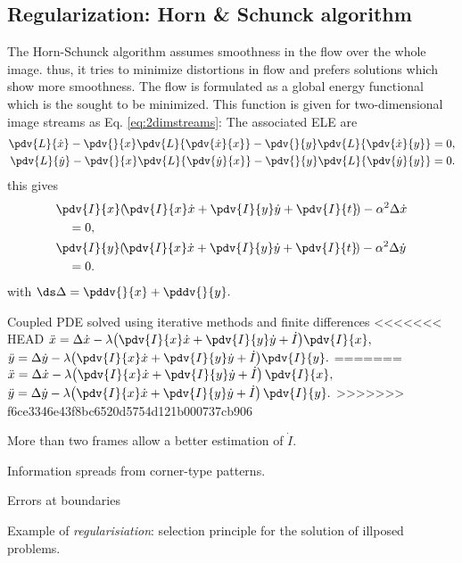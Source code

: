 \begin{compactdesc}
		\section{Regularization: Horn \& Schunck algorithm} 
		The Horn-Schunck algorithm assumes smoothness in the flow over the whole image. thus, it tries to minimize distortions in flow and prefers solutions which show more smoothness. The flow is formulated as a global energy functional which is the sought to be minimized. This function is given for two-dimensional image streams as Eq. \ref{eq:2dimstreams}:
		The associated ELE are 
		\begin{align*}
			\pdv{L}{\dot{x}}-\pdv{}{x}\pdv{L}{\pdv{\dot{x}}{x}}-\pdv{}{y}\pdv{L}{\pdv{\dot{x}}{y}}&=0,\\
			\pdv{L}{\dot{y}}-\pdv{}{x}\pdv{L}{\pdv{\dot{y}}{x}}-\pdv{}{y}\pdv{L}{\pdv{\dot{y}}{y}}&=0.
		\end{align*}
			this gives
		\begin{align*}
			&\pdv{I}{x}\!\left(\! \pdv{I}{x}\dot{x}+\pdv{I}{y}\dot{y}+\pdv{I}{t} \!\right)-\alpha^2\Delta \dot{x}\\
			&\quad=0,\\
			&\pdv{I}{y}\!\left(\! \pdv{I}{x}\dot{x}+\pdv{I}{y}\dot{y}+\pdv{I}{t} \!\right)-\alpha^2\Delta \dot{y}\\
			&\quad=0.
		\end{align*}
		with $\ds\Delta=\pddv{}{x}+\pddv{}{y}.$
	\item[\lp{Remarks}]\hfill
		\begin{enumerate*}[label=\protect\circled{\arabic*}]
			\item Coupled PDE solved using iterative methods and finite differences
<<<<<<< HEAD
				$\ddot{x}=\Delta \dot{x}-\lambda\!\left( \pdv{I}{x}\dot{x}+\pdv{I}{y}\dot{y}+\dot{I} \right)\!\pdv{I}{x},\\$\\
				$\ddot{y}=\Delta \dot{y}-\lambda\!\left( \pdv{I}{x}\dot{x}+\pdv{I}{y}\dot{y}+\dot{I} \right)\!\pdv{I}{y}.$
=======
				$\ddot{x}=\Delta \dot{x}-\lambda\!\left( \pdv{I}{x}\dot{x}+\pdv{I}{y}\dot{y}+\dot{I} \right)\pdv{I}{x},\\$\\
				$\ddot{y}=\Delta \dot{y}-\lambda\!\left( \pdv{I}{x}\dot{x}+\pdv{I}{y}\dot{y}+\dot{I} \right)\pdv{I}{y}.$
>>>>>>> f6ce3346e43f8bc6520d5754d121b000737cb906
		\item More than two frames allow a better estimation of $\dot{I}$.
			\item Information spreads from corner-type patterns.
			\item Errors at boundaries
			\item Example of \emph{regularisiation}: selection principle for the solution of illposed problems.
		\end{enumerate*}

\end{compactdesc}
